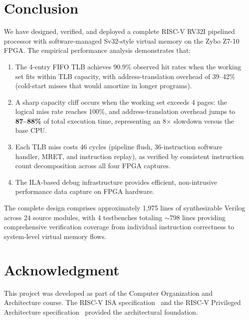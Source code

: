 \documentclass[conference]{IEEEtran}
\begin{document}
\section{Conclusion}

We have designed, verified, and deployed a complete RISC-V RV32I pipelined processor with software-managed Sv32-style virtual memory on the Zybo Z7-10 FPGA. The empirical performance analysis demonstrates that:

\begin{enumerate}
    \item The 4-entry FIFO TLB achieves 90.9\% observed hit rates when the working set fits within TLB capacity, with address-translation overhead of 39--42\% (cold-start misses that would amortize in longer programs).
    \item A sharp capacity cliff occurs when the working set exceeds 4 pages: the logical miss rate reaches 100\%, and address-translation overhead jumps to \textbf{87--88\%} of total execution time, representing an 8$\times$ slowdown versus the base CPU.
    \item Each TLB miss costs 46 cycles (pipeline flush, 36-instruction software handler, MRET, and instruction replay), as verified by consistent instruction count decomposition across all four FPGA captures.
    \item The ILA-based debug infrastructure provides efficient, non-intrusive performance data capture on FPGA hardware.
\end{enumerate}

The complete design comprises approximately 1,975 lines of synthesizable Verilog across 24 source modules, with 4 testbenches totaling $\sim$798 lines providing comprehensive verification coverage from individual instruction correctness to system-level virtual memory flows.

\section*{Acknowledgment}

This project was developed as part of the Computer Organization and Architecture course. The RISC-V ISA specification~\cite{b1} and the RISC-V Privileged Architecture specification~\cite{b2} provided the architectural foundation.
\end{document}
